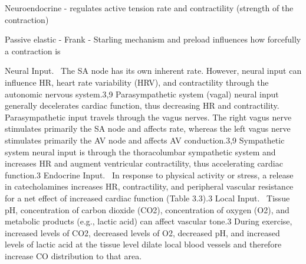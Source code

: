 Neuroendocrine - regulates active tension rate and contractility (strength of the contraction)

Passive elastic - Frank - Starling mechanism and preload influences how forcefully a contraction is

Neural Input. 
The SA node has its own inherent rate. However, neural input can influence HR, heart rate variability (HRV), and contractility through the autonomic nervous system.3,9
Parasympathetic system (vagal) neural input generally decelerates cardiac function, thus decreasing HR and contractility. Parasympathetic input travels through the vagus nerves. The right vagus nerve stimulates primarily the SA node and affects rate, whereas the left vagus nerve stimulates primarily the AV node and affects AV conduction.3,9
Sympathetic system neural input is through the thoracolumbar sympathetic system and increases HR and augment ventricular contractility, thus accelerating cardiac function.3
Endocrine Input. 
In response to physical activity or stress, a release in catecholamines increases HR, contractility, and peripheral vascular resistance for a net effect of increased cardiac function (Table 3.3).3
Local Input. 
Tissue pH, concentration of carbon dioxide (CO2), concentration of oxygen (O2), and metabolic products (e.g., lactic acid) can affect vascular tone.3 During exercise, increased levels of CO2, decreased levels of O2, decreased pH, and increased levels of lactic acid at the tissue level dilate local blood vessels and therefore increase CO distribution to that area.


